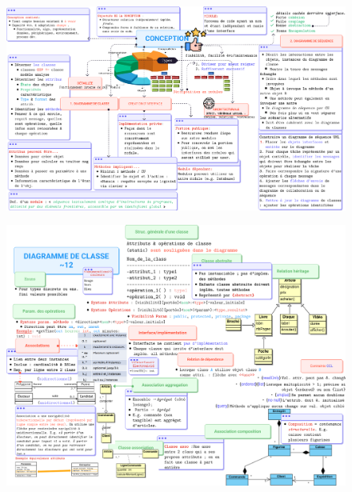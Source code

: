 \documentclass[16pt]{report}
\begin{document}
        \begin{figure}[H]
            \begin{center}
                \includegraphics[width=1.02\textwidth]{IFT2255Chapitre11.png}
            \end{center}
        \end{figure}


        \begin{figure}[H]
            \begin{center}
                \includegraphics[width=1.02\textwidth]{IFT2255Chapitre12.png}
            \end{center}
        \end{figure}
\end{document}
